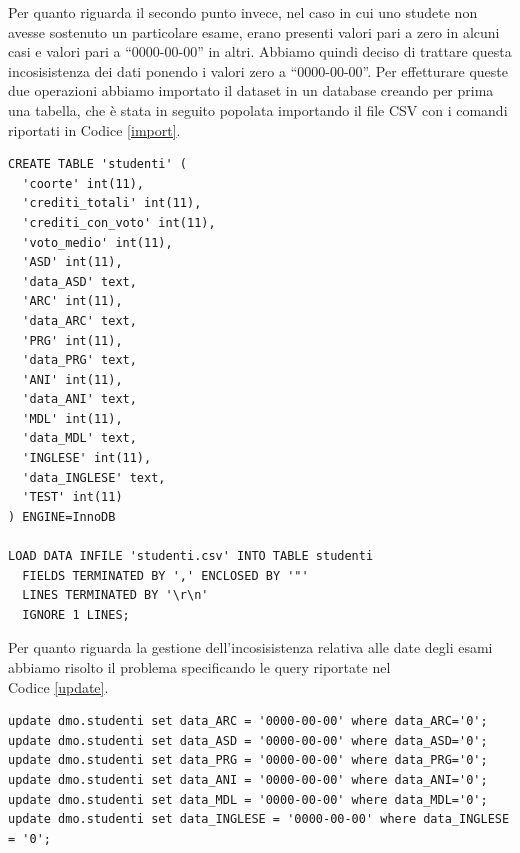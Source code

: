\documentclass[12pt]{article}
\begin{document}
Per quanto riguarda il secondo punto invece, nel caso in cui uno stu\-dete non avesse sostenuto un particolare esame, erano presenti valori pari a zero in alcuni casi e valori pari a ``0000-00-00'' in altri.
Abbiamo quindi deciso di trattare questa incosisistenza dei dati ponendo i valori zero a ``0000-00-00''.
Per effetturare queste due operazioni abbiamo importato il dataset in un database creando per prima una tabella, che è stata in seguito popolata importando il file CSV con i comandi riportati in Codice \ref{import}.
\begin{lstlisting}[caption={Creazione della table}, style=sql, label={import}, captionpos=b]
CREATE TABLE 'studenti' (
  'coorte' int(11),
  'crediti_totali' int(11),
  'crediti_con_voto' int(11),
  'voto_medio' int(11),
  'ASD' int(11),
  'data_ASD' text,
  'ARC' int(11),
  'data_ARC' text,
  'PRG' int(11),
  'data_PRG' text,
  'ANI' int(11),
  'data_ANI' text,
  'MDL' int(11),
  'data_MDL' text,
  'INGLESE' int(11),
  'data_INGLESE' text,
  'TEST' int(11)
) ENGINE=InnoDB

LOAD DATA INFILE 'studenti.csv' INTO TABLE studenti
  FIELDS TERMINATED BY ',' ENCLOSED BY '"'
  LINES TERMINATED BY '\r\n'
  IGNORE 1 LINES;
\end{lstlisting}
Per quanto riguarda la gestione dell'incosisistenza relativa alle date degli esami abbiamo risolto il problema specificando le query riportate nel \\Codice \ref{update}.
\begin{lstlisting}[caption={Update della tabella},style=sql, label={update},captionpos=b]
update dmo.studenti set data_ARC = '0000-00-00' where data_ARC='0'; 
update dmo.studenti set data_ASD = '0000-00-00' where data_ASD='0'; 
update dmo.studenti set data_PRG = '0000-00-00' where data_PRG='0'; 
update dmo.studenti set data_ANI = '0000-00-00' where data_ANI='0'; 
update dmo.studenti set data_MDL = '0000-00-00' where data_MDL='0';
update dmo.studenti set data_INGLESE = '0000-00-00' where data_INGLESE = '0';
\end{lstlisting}
\newpage
\end{document}
